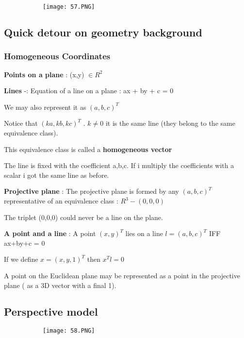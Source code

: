 \documentclass{article}
\begin{document}
\begin{figure}[ht!]
  \centering
  \begin{subfigure}[b]{0.5\linewidth}
    \texttt{[image: 57.PNG]}
  \end{subfigure}
\end{figure}

\subsection{Quick detour on geometry background}

\subsubsection{Homogeneous Coordinates}

\textbf{Points on a plane} : (x,y) $\in R^2$

\textbf{Lines} -: Equation of a line on a plane : ax + by + c = 0

We may also represent it as $(a,b,c)^T$

Notice that $(ka,kb,kc)^T$ . $k \neq 0$ it is the same line (they belong to the same equivalence class).

This equivalence class is called a \textbf{homogeneous vector}

The line is fixed with the coefficient a,b,c. If i multiply the coefficients with a scalar i got the same line as before.

\textbf{Projective plane} : The projective plane is formed by any $(a,b,c)^T$ representative of an equivalence class : $R^3 - (0,0,0)$

The triplet (0,0,0) could never be a line on the plane.

\textbf{A point and a line} : A point $(x,y)^T$ lies on a line $l = (a,b,c)^T$ IFF ax+by+c = 0

If we define $x = (x,y,1)^T$ then $x^Tl=0$

A point on the Euclidean plane may be represented as a point in the projective plane ( as a 3D vector with a final 1).


\vspace{40mm}

\subsection{Perspective model}

\begin{figure}[ht!]
  \centering
  \begin{subfigure}[b]{0.7\linewidth}
    \texttt{[image: 58.PNG]}
  \end{subfigure}
\end{figure}
\end{document}
